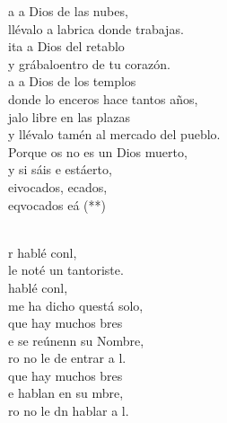 \documentclass[12pt]{article}
\begin{document}
\begin{multicols*}{2}
\begin{cancion}%
	\begin{chorus}%
	a a Dios de las nubes,\\
	llévalo a labrica donde trabajas. \\
	ita a Dios del retablo\\
	y grábaloentro de tu corazón.\\
	a a Dios de los templos\\
	donde lo enceros hace tantos años,\\
	jalo libre en las plazas \\
	y llévalo tamén al mercado del pueblo.\\
	Porque os no es un Dios muerto,\\
	y si sáis e estáerto, \\
	eivocados, ecados,\\
	eqvocados eá (**)\\
	\end{chorus}%
	\jump\\
	r hablé conl,\\
	le noté un tantoriste.\\
	 hablé conl,\\
	me ha dicho questá solo,\\
	que hay muchos bres\\
	e se reúnenn su Nombre,\\
	ro no le de entrar a l.\\
	que hay muchos bres\\
	e hablan en su mbre,\\
	ro no le dn hablar a l.\\
\end{cancion}%


\end{multicols*}
\end{document}
